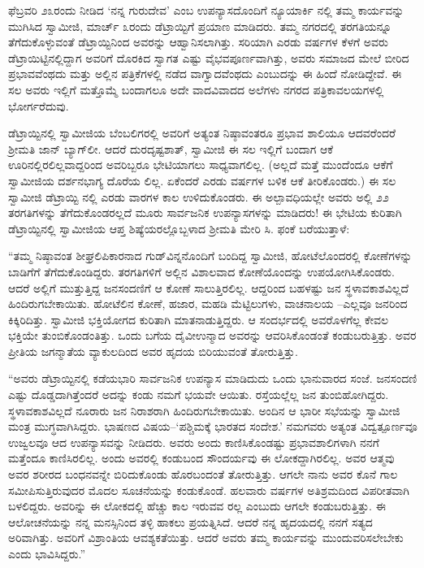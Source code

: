 ಫೆಬ್ರವರಿ ೨೩ರಂದು ನೀಡಿದ ‘ನನ್ನ ಗುರುದೇವ’ ಎಂಬ ಉಪನ್ಯಾಸದೊಂದಿಗೆ ನ್ಯೂಯಾರ್ಕಿ ನಲ್ಲಿ ತಮ್ಮ ಕಾರ್ಯವನ್ನು ಮುಗಿಸಿದ ಸ್ವಾಮೀಜಿ, ಮಾರ್ಚ್ ೩ರಂದು ಡೆಟ್ರಾಯ್ಟಿಗೆ ಪ್ರಯಾಣ ಮಾಡಿದರು. ತಮ್ಮ ನಗರದಲ್ಲಿ ತರಗತಿಯನ್ನೂ ತೆಗೆದುಕೊಳ್ಳುವಂತೆ ಡೆಟ್ರಾಯ್ಟಿನಿಂದ ಅವರನ್ನು ಆಹ್ವಾನಿಸಲಾಗಿತ್ತು. ಸರಿಯಾಗಿ ಎರಡು ವರ್ಷಗಳ ಕೆಳಗೆ ಅವರು ಡೆಟ್ರಾಯಿಟ್ಟಿನಲ್ಲಿದ್ದಾಗ ಅವರಿಗೆ ದೊರಕಿದ ಸ್ವಾಗತ ಎಷ್ಟು ವೈಭವಪೂರ್ಣವಾಗಿತ್ತು, ಅವರು ಸಮಾಜದ ಮೇಲೆ ಬೀರಿದ ಪ್ರಭಾವವೆಂಥದು ಮತ್ತು ಅಲ್ಲಿನ ಪತ್ರಿಕೆಗಳಲ್ಲಿ ನಡೆದ ವಾಗ್ವಾದವೆಂಥದು ಎಂಬುದನ್ನು ಈ ಹಿಂದೆ ನೋಡಿದ್ದೇವೆ. ಈ ಸಲ ಅವರು ಇಲ್ಲಿಗೆ ಮತ್ತೊಮ್ಮೆ ಬಂದಾಗಲೂ ಅದೇ ವಾದವಿವಾದದ ಅಲೆಗಳು ನಗರದ ಪತ್ರಿಕಾವಲಯಗಳಲ್ಲಿ ಭೋರ್ಗರೆದುವು.

ಡೆಟ್ರಾಯ್ಟಿನಲ್ಲಿ ಸ್ವಾಮೀಜಿಯ ಬೆಂಬಲಿಗರಲ್ಲಿ ಅವರಿಗೆ ಅತ್ಯಂತ ನಿಷ್ಠಾವಂತರೂ ಪ್ರಭಾವ ಶಾಲಿಯೂ ಆದವರೆಂದರೆ ಶ್ರೀಮತಿ ಜಾನ್ ಬ್ಯಾಗ್​ಲೀ. ಆದರೆ ದುರದೃಷ್ಟಶಾತ್, ಸ್ವಾಮೀಜಿ ಈ ಸಲ ಇಲ್ಲಿಗೆ ಬಂದಾಗ ಆಕೆ ಊರಿನಲ್ಲಿರಲಿಲ್ಲವಾದ್ದರಿಂದ ಅವರಿಬ್ಬರೂ ಭೇಟಿಯಾಗಲು ಸಾಧ್ಯವಾಗಲಿಲ್ಲ. (ಅಲ್ಲದೆ ಮತ್ತೆ ಮುಂದೆಂದೂ ಆಕೆಗೆ ಸ್ವಾಮೀಜಿಯ ದರ್ಶನಭಾಗ್ಯ ದೊರೆಯ ಲಿಲ್ಲ. ಏಕೆಂದರೆ ಎರಡು ವರ್ಷಗಳ ಬಳಿಕ ಆಕೆ ತೀರಿಕೊಂಡರು.) ಈ ಸಲ ಸ್ವಾಮೀಜಿ ಡೆಟ್ರಾಯ್ಟಿ ನಲ್ಲಿ ಎರಡು ವಾರಗಳ ಕಾಲ ಉಳಿದುಕೊಂಡರು. ಈ ಅಲ್ಪಾವಧಿಯಲ್ಲೇ ಅವರು ಅಲ್ಲಿ ೨೨ ತರಗತಿಗಳನ್ನು ತೆಗೆದುಕೊಂಡರಲ್ಲದೆ ಮೂರು ಸಾರ್ವಜನಿಕ ಉಪನ್ಯಾಸಗಳನ್ನು ಮಾಡಿದರು! ಈ ಭೇಟಿಯ ಕುರಿತಾಗಿ ಡೆಟ್ರಾಯ್ಟಿನಲ್ಲಿ ಸ್ವಾಮೀಜಿಯ ಆಪ್ತ ಶಿಷ್ಯೆಯರಲ್ಲೊಬ್ಬಳಾದ ಶ್ರೀಮತಿ ಮೇರಿ ಸಿ. ಫಂಕೆ ಬರೆಯುತ್ತಾಳೆ:

“ತಮ್ಮ ನಿಷ್ಠಾವಂತ ಶೀಘ್ರಲಿಪಿಕಾರನಾದ ಗುಡ್​ವಿನ್ನನೊಂದಿಗೆ ಬಂದಿದ್ದ ಸ್ವಾಮೀಜಿ, ಹೋಟೆಲೊಂದರಲ್ಲಿ ಕೋಣೆಗಳನ್ನು ಬಾಡಿಗೆಗೆ ತೆಗೆದುಕೊಂಡಿದ್ದರು. ತರಗತಿಗಳಿಗೆ ಅಲ್ಲಿನ ವಿಶಾಲವಾದ ಕೋಣೆಯೊಂದನ್ನು ಉಪಯೋಗಿಸಿಕೊಂಡರು. ಆದರೆ ಅಲ್ಲಿಗೆ ಮುತ್ತುತ್ತಿದ್ದ ಜನಸಂದಣಿಗೆ ಆ ಕೋಣೆ ಸಾಲುತ್ತಿರಲಿಲ್ಲ. ಆದ್ದರಿಂದ ಬಹಳಷ್ಟು ಜನ ಸ್ಥಳಾವಕಾಶವಿಲ್ಲದೆ ಹಿಂದಿರುಗಬೇಕಾಯಿತು. ಹೋಟೆಲಿನ ಕೋಣೆ, ಹಜಾರ, ಮಹಡಿ ಮೆಟ್ಟಿಲುಗಳು, ವಾಚನಾಲಯ –ಎಲ್ಲವೂ ಜನರಿಂದ ಕಿಕ್ಕಿರಿದಿತ್ತು. ಸ್ವಾಮೀಜಿ ಭಕ್ತಿಯೋಗದ ಕುರಿತಾಗಿ ಮಾತನಾಡುತ್ತಿದ್ದರು. ಆ ಸಂದರ್ಭದಲ್ಲಿ ಅವರೊಳಗೆಲ್ಲ ಕೇವಲ ಭಕ್ತಿಯೇ ತುಂಬಿಕೊಂಡಂತಿತ್ತು. ಒಂದು ಬಗೆಯ ದೈವೀಉನ್ಮಾದ ಅವರನ್ನು ಆವರಿಸಿಕೊಂಡಂತೆ ಕಂಡುಬರುತ್ತಿತ್ತು. ಅವರ ಪ್ರೀತಿಯ ಜಗನ್ಮಾತೆಯ ವ್ಯಾಕುಲದಿಂದ ಅವರ ಹೃದಯ ಬಿರಿಯುವಂತೆ ತೋರುತ್ತಿತ್ತು.

“ಅವರು ಡೆಟ್ರಾಯ್ಟಿನಲ್ಲಿ ಕಡೆಯಭಾರಿ ಸಾರ್ವಜನಿಕ ಉಪನ್ಯಾಸ ಮಾಡಿದುದು ಒಂದು ಭಾನುವಾರದ ಸಂಜೆ. ಜನಸಂದಣಿ ಎಷ್ಟು ದೊಡ್ಡದಾಗಿತ್ತೆಂದರೆ ಅದನ್ನು ಕಂಡು ನಮಗೆ ಭಯವೇ ಆಯಿತು. ರಸ್ತೆಯಲ್ಲೆಲ್ಲ ಜನ ತುಂಬಿಹೋಗಿದ್ದರು. ಸ್ಥಳಾವಕಾಶವಿಲ್ಲದೆ ನೂರಾರು ಜನ ನಿರಾಶರಾಗಿ ಹಿಂದಿರುಗಬೇಕಾಯಿತು. ಅಂದಿನ ಆ ಭಾರೀ ಸಭೆಯನ್ನು ಸ್ವಾಮೀಜಿ ಮಂತ್ರ ಮುಗ್ಧವಾಗಿಸಿದ್ದರು. ಭಾಷಣದ ವಿಷಯ–‘ಪಶ್ಚಿಮಕ್ಕೆ ಭಾರತದ ಸಂದೇಶ.’ ನಮಗವರು ಅತ್ಯಂತ ವಿದ್ವತ್ಪೂರ್ಣವೂ ಉಜ್ವಲವೂ ಆದ ಉಪನ್ಯಾಸವನ್ನು ನೀಡಿದರು. ಅವರು ಅಂದು ಕಾಣಿಸಿಕೊಂಡಷ್ಟು ಪ್ರಭಾವಶಾಲಿಗಳಾಗಿ ನನಗೆ ಮತ್ತೆಂದೂ ಕಾಣಿಸಿರಲಿಲ್ಲ. ಅಂದು ಅವರಲ್ಲಿ ಕಂಡುಬಂದ ಸೌಂದರ್ಯವು ಈ ಲೋಕದ್ದಾಗಿರಲಿಲ್ಲ. ಅವರ ಆತ್ಮವು ಅವರ ಶರೀರದ ಬಂಧನವನ್ನೇ ಬಿರಿದುಕೊಂಡು ಹೊರಬಂದಂತೆ ತೋರುತ್ತಿತ್ತು. ಆಗಲೇ ನಾನು ಅವರ ಕೊನೆ ಗಾಲ ಸಮೀಪಿಸುತ್ತಿರುವುದರ ಮೊದಲ ಸೂಚನೆಯನ್ನು ಕಂಡುಕೊಂಡೆ. ಹಲವಾರು ವರ್ಷಗಳ ಅತಿಶ್ರಮದಿಂದ ವಿಪರೀತವಾಗಿ ಬಳಲಿದ್ದರು. ಅವರಿನ್ನು ಈ ಲೋಕದಲ್ಲಿ ಹೆಚ್ಚು ಕಾಲ ಇರುವವ ರಲ್ಲ ಎಂಬುದು ಆಗಲೇ ಕಂಡುಬರುತ್ತಿತ್ತು. ಈ ಆಲೋಚನೆಯನ್ನು ನನ್ನ ಮನಸ್ಸಿನಿಂದ ತಳ್ಳಿ ಹಾಕಲು ಪ್ರಯತ್ನಿಸಿದೆ. ಆದರೆ ನನ್ನ ಹೃದಯದಲ್ಲಿ ನನಗೆ ಸತ್ಯದ ಅರಿವಾಗಿತ್ತು. ಅವರಿಗೆ ವಿಶ್ರಾಂತಿಯ ಆವಶ್ಯಕತೆಯಿತ್ತು. ಆದರೆ ಅವರು ತಮ್ಮ ಕಾರ್ಯವನ್ನು ಮುಂದುವರಿಸಲೇಬೇಕು ಎಂದು ಭಾವಿಸಿದ್ದರು.”

